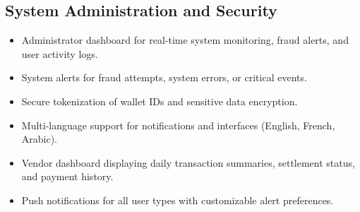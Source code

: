 \subsection{System Administration and Security}
\begin{itemize}
    \item Administrator dashboard for real-time system monitoring, fraud alerts, and user activity logs.
    \item System alerts for fraud attempts, system errors, or critical events.
    \item Secure tokenization of wallet IDs and sensitive data encryption.
    \item Multi-language support for notifications and interfaces (English, French, Arabic).
    \item Vendor dashboard displaying daily transaction summaries, settlement status, and payment history.
    \item Push notifications for all user types with customizable alert preferences.
\end{itemize}
